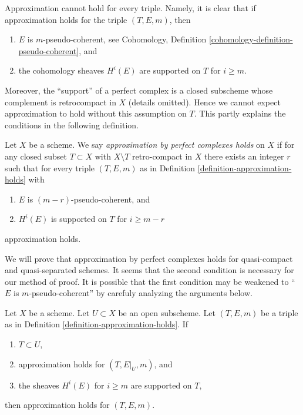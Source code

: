 \noindent
Approximation cannot hold for every triple. Namely, it is clear that if
approximation holds for the triple $(T, E, m)$, then
\begin{enumerate}
\item $E$ is $m$-pseudo-coherent, see
Cohomology, Definition \ref{cohomology-definition-pseudo-coherent}, and
\item the cohomology sheaves $H^i(E)$ are supported on $T$ for $i \geq m$.
\end{enumerate}
Moreover, the ``support'' of a perfect complex is a closed subscheme
whose complement is retrocompact in $X$ (details omitted). Hence we cannot
expect approximation to hold without this assumption on $T$.
This partly explains the conditions in the following definition.

\begin{definition}
\label{definition-approximation}
Let $X$ be a scheme. We say {\it approximation by perfect complexes holds}
on $X$ if for any closed subset $T \subset X$ with $X \setminus T$
retro-compact in $X$ there exists an integer $r$ such that
for every triple $(T, E, m)$ as in
Definition \ref{definition-approximation-holds} with
\begin{enumerate}
\item $E$ is $(m - r)$-pseudo-coherent, and
\item $H^i(E)$ is supported on $T$ for $i \geq m - r$
\end{enumerate}
approximation holds.
\end{definition}

\noindent
We will prove that approximation by perfect complexes holds for
quasi-compact and quasi-separated schemes. It seems that the second
condition is necessary for our method of proof. It is possible that the
first condition may be weakened to ``$E$ is $m$-pseudo-coherent''
by carefuly analyzing the arguments below.

\begin{lemma}
\label{lemma-open}
Let $X$ be a scheme. Let $U \subset X$ be an open subscheme.
Let $(T, E, m)$ be a triple as in
Definition \ref{definition-approximation-holds}.
If
\begin{enumerate}
\item $T \subset U$,
\item approximation holds for $(T, E|_U, m)$, and
\item the sheaves $H^i(E)$ for $i \geq m$ are supported on $T$,
\end{enumerate}
then approximation holds for $(T, E, m)$.
\end{lemma}


